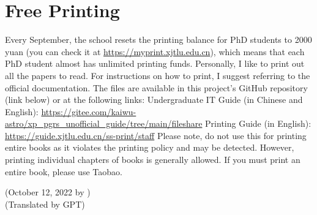 \section{Free Printing}

Every September, the school resets the printing balance for PhD students to 2000 yuan (you can check it at \url{https://myprint.xjtlu.edu.cn}), which means that each PhD student almost has unlimited printing funds. Personally, I like to print out all the papers to read.
For instructions on how to print, I suggest referring to the official documentation. The files are available in this project’s GitHub repository (link below) or at the following links:
Undergraduate IT Guide (in Chinese and English): \url{https://gitee.com/kaiwu-astro/xp_pgrs_unofficial_guide/tree/main/fileshare}
Printing Guide (in English): \url{https://guide.xjtlu.edu.cn/ss-print/staff}
Please note, do not use this for printing entire books as it violates the printing policy and may be detected. However, printing individual chapters of books is generally allowed. If you must print an entire book, please use Taobao.

\begin{flushright} 
    (October 12, 2022 by \Wu) \\
    (Translated by GPT)
\end{flushright}